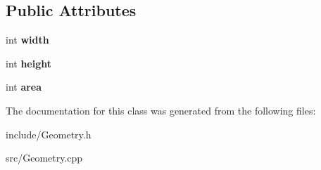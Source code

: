 \subsection*{Public Attributes}
\begin{DoxyCompactItemize}
\item 
\hypertarget{classSize_aa1f23158085de487cfd5434301c077a4}{}int {\bfseries width}\label{classSize_aa1f23158085de487cfd5434301c077a4}

\item 
\hypertarget{classSize_a4cdfe2d67b3f87b3f5d86bfafd5df036}{}int {\bfseries height}\label{classSize_a4cdfe2d67b3f87b3f5d86bfafd5df036}

\item 
\hypertarget{classSize_a9603965bb9c8fd9fc0ae651412b2a3e0}{}int {\bfseries area}\label{classSize_a9603965bb9c8fd9fc0ae651412b2a3e0}

\end{DoxyCompactItemize}


The documentation for this class was generated from the following files\+:\begin{DoxyCompactItemize}
\item 
include/Geometry.\+h\item 
src/Geometry.\+cpp\end{DoxyCompactItemize}
